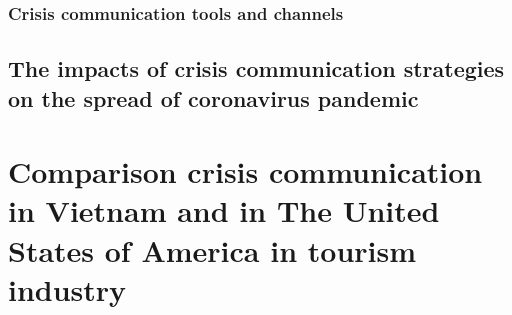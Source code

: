 \documentclass[draft=false
              ,paper=a4
              ,twoside=false
              ,fontsize=12pt
              ,headsepline
              ,BCOR10mm
              ,DIV11
              ]{scrbook}
\begin{document}
\vspace{12pt}
\subsection{Crisis communication tools and channels}
\vspace{6pt}

\vspace{12pt}
\section{The impacts of crisis communication strategies on the spread of coronavirus pandemic}
\vspace{6pt}

\vspace{12pt}
\chapter{\phantom{o}Comparison crisis communication in Vietnam and in The United States of America in tourism industry}
\vspace{6pt}

\printbibliography
\end{document}
